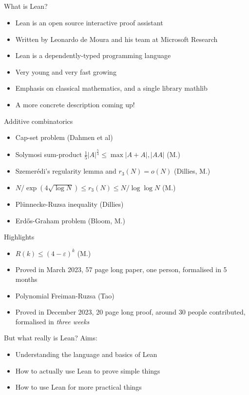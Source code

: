 \documentclass[usenames,dvipsnames,handout]{beamer}
\begin{document}
\subsection{}
\begin{frame}{What is Lean?}
  \begin{itemize}[<+->]
    \item Lean is an open source interactive proof assistant
    \item Written by Leonardo de Moura and his team at Microsoft Research
    \item Lean is a dependently-typed programming language
    \item Very young and very fast growing
    \vspace{3mm}
    \item Emphasis on classical mathematics, and a single library mathlib
    \item A more concrete description coming up!
  \end{itemize}
\end{frame}
\begin{frame}{Additive combinatorics}
  \begin{itemize}[<+->]
    \item Cap-set problem (Dahmen et al)
    \item Solymosi sum-product $\frac{1}{5}|A|^{\frac{5}{4}} \leq \max |A+A|, |AA|$ (M.)
    \item Szemer\'{e}di's regularity lemma and $r_{3}(N) = o(N)$ (Dillies, M.)
    \item $N / \exp(4 \sqrt{\log N}) \leq r_{3}(N) \leq N / \log \log N$ (M.)
    \item Pl\"{u}nnecke-Ruzsa inequality (Dillies)
    \item Erd\H{o}s-Graham problem (Bloom, M.)
  \end{itemize}
\end{frame}
\begin{frame}{Highlights}
  \begin{itemize}[<+->]
    \item $R(k) \leq (4 - \varepsilon) ^ k$ (M.)
    \item Proved in March 2023, 57 page long paper, one person, formalised in 5 months
      \vspace{3mm}
    \item Polynomial Freiman-Ruzsa (Tao)
    \item Proved in December 2023, 20 page long proof, around 30 people contributed, formalised in \emph{three weeks}
  \end{itemize}
\end{frame}

\begin{frame}{But what really is Lean?}
  Aims:
  \begin{itemize}
    \item Understanding the language and basics of Lean
    \item How to actually use Lean to prove simple things
    \item How to use Lean for more practical things
  \end{itemize}
\end{frame}
\end{document}
